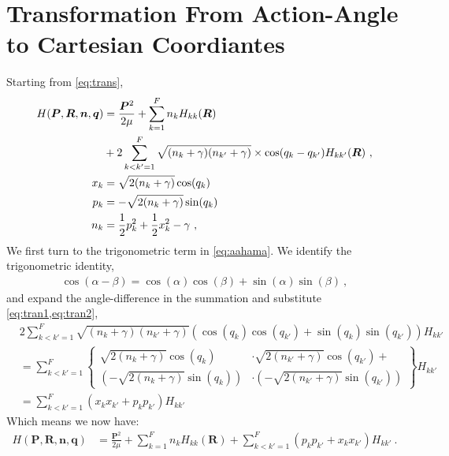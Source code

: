 \section{Transformation From Action-Angle to Cartesian Coordiantes}\label{s:aatocar}
Starting from \cref{eq:trans},
\begin{subequations}\label{eq:trans}
\begin{align}
H(\bm{P},\bm{R},\bm{n},\bm{q}) &= \frac{\bm{P}^{2}}{2 \mu} + \sum\limits_{k=1}^{F} n_{k} H_{kk}(\bm{R}) \label{eq:aahama}\\
& + 2 \sum\limits_{k<k'=1}^{F} \sqrt{(n_{k}+\gamma)(n_{k'}+\gamma)} \times \cos(q_{k}-q_{k'})H_{kk'}(\bm{R})~,\nonumber\\
x_{k} &= \sqrt{2(n_{k} + \gamma)} \cos(q_{k})\label{eq:tran1}\\
p_{k} &= -\sqrt{2(n_{k} + \gamma)} \sin(q_{k})\label{eq:tran2}\\
n_{k} &= \frac{1}{2} p_{k}^{2} + \frac{1}{2} x_{k}^{2} - \gamma\label{eq:nk}~,
\end{align}
\end{subequations}
We first turn to the trigonometric term in \cref{eq:aahama}. We identify the trigonometric identity,
\begin{align}
\cos(\alpha-\beta) = \cos(\alpha)\cos(\beta) + \sin(\alpha)\sin(\beta)~,
\end{align}
and expand the angle-difference in the summation and substitute \cref{eq:tran1,eq:tran2},
\begin{subequations}
\begin{align}
& 2 \sum\limits_{k<k'=1}^{F} \sqrt{(n_{k}+\gamma)(n_{k'}+\gamma)} (\cos(q_{k})\cos(q_{k'}) + \sin(q_{k})\sin(q_{k'}))H_{kk'}\\
&= \sum\limits_{k<k'=1}^{F} \left\{\begin{aligned}
\sqrt{2(n_{k} + \gamma)} \cos(q_{k}) &\cdot \sqrt{2(n_{k'} + \gamma)} \cos(q_{k'})+\\
\left(-\sqrt{2(n_{k} + \gamma)} \sin(q_{k})\right) &\cdot \left(-\sqrt{2(n_{k'} + \gamma)} \sin(q_{k'})\right)
\end{aligned}\right\}H_{kk'}\\
& = \sum\limits_{k<k'=1}^{F} (x_{k}x_{k'} + p_{k}p_{k'})H_{kk'}
\end{align}
\end{subequations}
Which means we now have:
\begin{align}
H(\bm{P},\bm{R},\bm{n},\bm{q}) &= \frac{\bm{P}^{2}}{2 \mu} + \sum\limits_{k=1}^{F} n_{k} H_{kk}(\bm{R}) + \sum\limits_{k<k'=1}^{F} (p_{k}p_{k'} + x_{k}x_{k'})H_{kk'}~.
\end{align}

